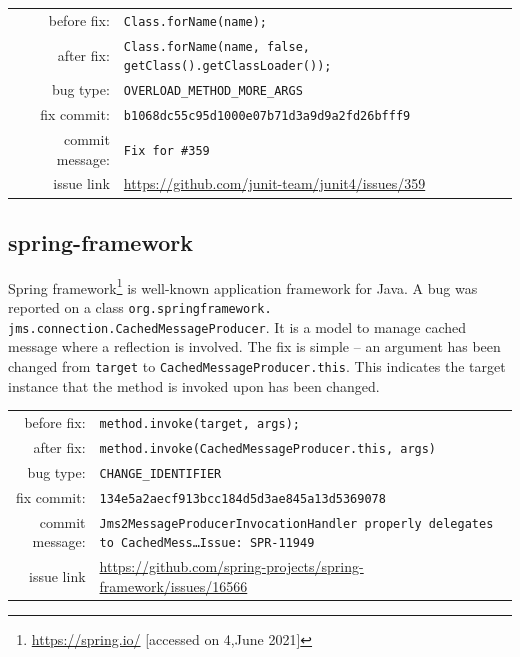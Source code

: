 \documentclass[sigconf,review,anonymous]{acmart}
\begin{document}
\begin{table}[h!]
  \footnotesize
  \label{tab:junit4}
  \begin{tabular}{rp{5cm}}
    before fix:  &  \footnotesize{\texttt{Class.forName(name);}}\\
    after fix:  &  \footnotesize{\texttt{Class.forName(name, false, getClass().getClassLoader());}} \\
    bug type:   &  \texttt{OVERLOAD\_METHOD\_MORE\_ARGS} \\
    fix commit: &  \texttt{b1068dc55c95d1000e07b71d3a9d9a2fd26bfff9} \\
    commit message:   &  \texttt{Fix for \#359}\\
    issue link &  \url{https://github.com/junit-team/junit4/issues/359}
  \end{tabular}
\end{table}
                                  

\subsection{spring-framework}

Spring framework\footnote{\url{https://spring.io/} [accessed on 4,June 2021]} is well-known application framework for Java. A bug was reported on a class \texttt{org.springframework.\\jms.connection.CachedMessageProducer}. It is a model to manage cached message where a reflection is involved. The fix is simple -- an argument has been changed from \texttt{target} to \texttt{CachedMessageProducer.this}. This indicates the target instance that the method is invoked upon has been changed. 
\begin{table}[h!]
  \footnotesize
  \label{tab:spring}
  \begin{tabular}{rp{5cm}}
    before fix:  &  \footnotesize{\texttt{method.invoke(target, args);}} \\
    after fix:  &  \footnotesize{\texttt{method.invoke(CachedMessageProducer.this, args)}} \\
    bug type:   &  \texttt{CHANGE\_IDENTIFIER} \\
    fix commit: &  \texttt{134e5a2aecf913bcc184d5d3ae845a13d5369078} \\
    commit message:   &  \texttt{Jms2MessageProducerInvocationHandler properly delegates to CachedMess…Issue: SPR-11949}\\
    issue link &  \url{https://github.com/spring-projects/spring-framework/issues/16566}
  \end{tabular}
\end{table}
\end{document}
